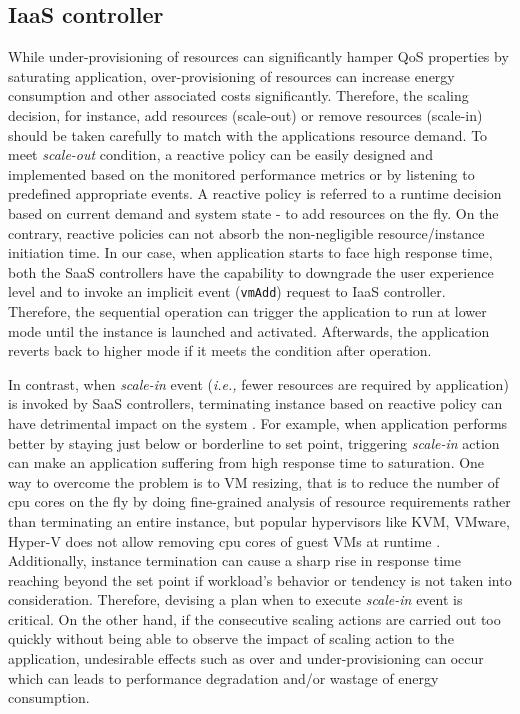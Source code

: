 \subsection{IaaS controller}


While under-provisioning of resources can significantly hamper QoS properties by saturating application, over-provisioning of resources can increase energy consumption and other associated costs significantly. Therefore, the scaling decision, for instance, add resources (scale-out) or remove resources (scale-in) should be taken carefully to match with the applications resource demand. To meet \emph{scale-out} condition, a reactive policy can be easily designed and implemented based on the monitored performance metrics or by listening to predefined appropriate events. A reactive policy is referred to a runtime decision based on current demand and system state - to add resources on the fly. On the contrary, reactive policies can not absorb the non-negligible resource/instance initiation time. In our case, when application starts to face high response time, both the SaaS controllers have the capability to downgrade the user experience level and to invoke an implicit event (\texttt{vmAdd}) request to IaaS controller. Therefore, the sequential operation can trigger the application to run at lower mode until the instance is launched and activated. Afterwards, the application reverts back to higher mode if it meets the condition after operation.

In contrast, when \emph{scale-in} event (\emph{i.e.,} fewer resources are required by application) is invoked by SaaS controllers, terminating instance based on reactive policy can have detrimental impact on the system \cite{magali}. For example, when application performs better by staying just below or borderline to set point, triggering \emph{scale-in} action can make an application suffering from high response time to saturation. One way to overcome the problem is to VM resizing, that is to reduce the number of cpu cores on the fly by doing fine-grained analysis of resource requirements rather than terminating an entire instance, but popular hypervisors like KVM, VMware, Hyper-V does not allow removing cpu cores of guest VMs at runtime \cite{vertical}.
Additionally, instance termination can cause a sharp rise in response time reaching beyond the set point if workload's behavior or tendency is not taken into consideration. Therefore, devising a plan when to execute \emph{scale-in} event is critical. On the other hand, if the consecutive scaling actions are carried out too quickly without being able to observe the impact of scaling action to the application, undesirable effects such as over and under-provisioning can occur which can leads to performance degradation and/or wastage of energy consumption.
  
